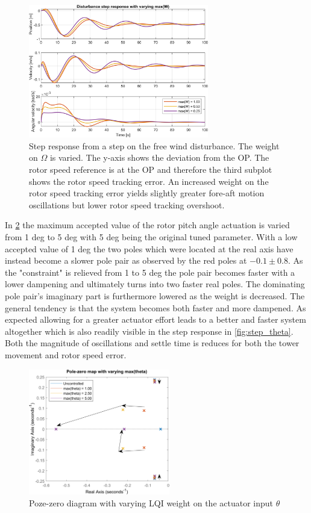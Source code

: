 \begin{figure}[ht]
	\centering
	\includegraphics[width=0.7\textwidth]{Graphics/LQI pole zero/103_step_W.png}
	\caption{Step response from a step on the free wind disturbance. The weight on $ \Omega $ is varied. The y-axis shows the deviation from the OP. The rotor speed reference is at the OP and therefore the third subplot shows the rotor speed tracking error. An increased weight on the rotor speed tracking error yields slightly greater fore-aft motion oscillations but lower rotor speed tracking overshoot.}
	\label{fig:step_W}
\end{figure}

In \cref{fig:pzmap_theta} the maximum accepted value of the rotor pitch angle actuation is varied from 1 deg to 5 deg with 5 deg being the original tuned parameter. With a low accepted value of 1 deg the two poles which were located at the real axis have instead become a slower pole pair as observed by the red poles at $ -0.1 \pm0.8 $. As the "constraint" is relieved from 1 to 5 deg the pole pair becomes faster with a lower dampening and ultimately turns into two faster real poles. The dominating pole pair's imaginary part is furthermore lowered as the weight is decreased. The general tendency is that the system becomes both faster and more dampened. As expected allowing for a greater actuator effort leads to a better and faster system altogether which is also readily visible in the step response in \cref{fig:step_theta}. Both the magnitude of oscillations and settle time is reduces for both the tower movement and rotor speed error.
\begin{figure}[ht]
	\centering
	\includegraphics[width=0.55\textwidth]{Graphics/LQI pole zero/05_pzmap_theta.png}
	\caption{Poze-zero diagram with varying LQI weight on the actuator input $ \theta $}
	\label{fig:pzmap_theta}
\end{figure}

